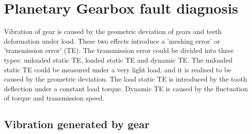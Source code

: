 \section{Planetary Gearbox fault diagnosis}

Vibration of gear is caused by the geometric deviation of gears and teeth deformation under load. These two effects introduce a 'meshing error' or 'transmission error' (TE). \cite{vbcm}The transmission error could be divided into three types: unloaded static TE, loaded static TE and dynamic TE. The unloaded static TE could be measured under a very light load, and it is realised to be caused by the geometric deviation. The load static TE is introduced by the tooth deflection under a constant load torque. Dynamic TE is caused by the fluctuation of torque and transmission speed.


\subsection{Vibration generated by gear}

